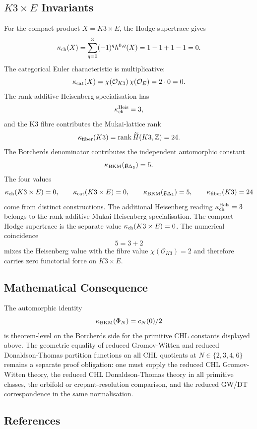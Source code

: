 \subsection*{\texorpdfstring{$K3\times E$}{K3 x E} Invariants}

For the compact product $X=K3\times E$, the Hodge supertrace gives
\[
 \kappa_{\mathrm{ch}}(X)
 =
 \sum_{q=0}^3(-1)^qh^{0,q}(X)
 =
 1-1+1-1
 =
 0.
\]
The categorical Euler characteristic is multiplicative:
\[
 \kappa_{\mathrm{cat}}(X)
 =
 \chi(\mathcal{O}_{K3})\,\chi(\mathcal{O}_E)
 =
 2\cdot 0
 =
 0.
\]
The rank-additive Heisenberg specialisation has
\[
 \kappa_{\mathrm{ch}}^{\mathrm{Heis}}=3,
\]
and the K3 fibre contributes the Mukai-lattice rank
\[
 \kappa_{\mathrm{fiber}}(K3)
 =
 \operatorname{rank}\widetilde H(K3,\mathbb{Z})
 =
 24.
\]
The Borcherds denominator contributes the independent automorphic
constant
\[
 \kappa_{\mathrm{BKM}}(\mathfrak g_{\Delta_5})=5.
\]
The four values
\[
 \kappa_{\mathrm{ch}}(K3\times E)=0,\qquad
 \kappa_{\mathrm{cat}}(K3\times E)=0,\qquad
 \kappa_{\mathrm{BKM}}(\mathfrak g_{\Delta_5})=5,\qquad
 \kappa_{\mathrm{fiber}}(K3)=24
\]
come from distinct constructions.  The additional Heisenberg reading
$\kappa_{\mathrm{ch}}^{\mathrm{Heis}}=3$ belongs to the rank-additive
Mukai-Heisenberg specialisation.  The compact Hodge supertrace is the
separate value $\kappa_{\mathrm{ch}}(K3\times E)=0$.
The numerical coincidence
\[
 5=3+2
\]
mixes the Heisenberg value with the fibre value
$\chi(\mathcal{O}_{K3})=2$ and therefore carries zero functorial force on
$K3\times E$.

\subsection*{Mathematical Consequence}

The automorphic identity
\[
 \kappa_{\mathrm{BKM}}(\Phi_N)=c_N(0)/2
\]
is theorem-level on the Borcherds side for the primitive CHL constants
displayed above.  The geometric equality of reduced
Gromov-Witten and reduced Donaldson-Thomas partition functions on all
CHL quotients at $N\in\{2,3,4,6\}$ remains a separate proof obligation:
one must supply the reduced CHL Gromov-Witten theory, the reduced CHL
Donaldson-Thomas theory in all primitive classes, the orbifold or
crepant-resolution comparison, and the reduced GW/DT correspondence in
the same normalisation.

\subsection*{References}

